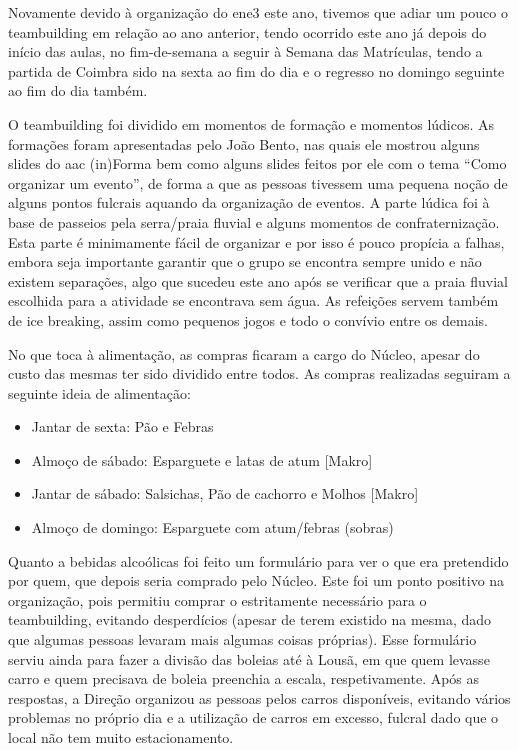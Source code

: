 Novamente devido à organização do \acrshort{ene3} este ano, tivemos que adiar um pouco o teambuilding em relação ao ano anterior, tendo ocorrido este ano já depois do início das aulas, no fim-de-semana a seguir à Semana das Matrículas, tendo a partida de Coimbra sido na sexta ao fim do dia e o regresso no domingo seguinte ao fim do dia também.

O teambuilding foi dividido em momentos de formação e momentos lúdicos. As formações foram apresentadas pelo João Bento, nas quais ele mostrou alguns slides do \acrshort{aac} (in)Forma bem como alguns slides feitos por ele com o tema “Como organizar um evento”, de forma a que as pessoas tivessem uma pequena noção de alguns pontos fulcrais aquando da organização de eventos. A parte lúdica foi à base de passeios pela serra/praia fluvial e alguns momentos de confraternização. Esta parte é minimamente fácil de organizar e por isso é pouco propícia a falhas, embora seja importante garantir que o grupo se encontra sempre unido e não existem separações, algo que sucedeu este ano após se verificar que a praia fluvial escolhida para a atividade se encontrava sem água. As refeições servem também de ice breaking, assim como pequenos jogos e todo o convívio entre os demais.

No que toca à alimentação, as compras ficaram a cargo do Núcleo, apesar do custo das mesmas ter sido dividido entre todos. As compras realizadas seguiram a seguinte ideia de alimentação:
\begin{itemize}
\item Jantar de sexta: Pão e Febras
\item Almoço de sábado: Esparguete e latas de atum [Makro]
\item Jantar de sábado: Salsichas, Pão de cachorro e Molhos [Makro]
\item Almoço de domingo: Esparguete com atum/febras (sobras)
\end{itemize}

Quanto a bebidas alcoólicas foi feito um formulário para ver o que era pretendido por quem, que depois seria comprado pelo Núcleo. Este foi um ponto positivo na organização, pois permitiu comprar o estritamente necessário para o teambuilding, evitando desperdícios (apesar de terem existido na mesma, dado que algumas pessoas levaram mais algumas coisas próprias). Esse formulário serviu ainda para fazer a divisão das boleias até à Lousã, em que quem levasse carro e quem precisava de boleia preenchia a escala, respetivamente. Após as respostas, a Direção organizou as pessoas pelos carros disponíveis, evitando vários problemas no próprio dia e a utilização de carros em excesso, fulcral dado que o local não tem muito estacionamento.

